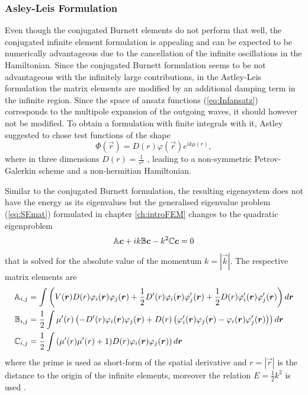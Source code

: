 \subsubsection{Asley-Leis Formulation}
Even though the conjugated Burnett elements do not perform that well, the conjugated infinite element formulation is appealing and can be expected to be numerically advantageous due to the cancellation of the infinite oscillations in the Hamiltonian.
Since the conjugated Burnett formulation seems to be not advantageous with the infinitely large contributions, in the Astley-Leis formulation the matrix elements are modified by an additional damping term in the infinite region.
Since the space of ansatz functions (\ref{eq:Infansatz}) corresponds to the multipole expansion of the outgoing waves, it should however not be modified.
To obtain a formulation with finite integrals with it, Astley suggested to chose test functions of the shape
\begin{equation} \label{eq:ALelem}
 \Phi(\vec{r}) = D(r)\varphi(\vec{r}) e^{ik\mu(r)},
\end{equation}
where in three dimensions $D(r)=\frac{1}{r^2}$ \cite{astley2}, leading to a non-symmetric Petrov-Galerkin scheme and a non-hermitian Hamiltonian.

Similar to the conjugated Burnett formulation, the resulting eigensystem does not have the energy as its eigenvalues but the generalised eigenvalue problem (\ref{eq:SEmat}) formulated in chapter \ref{ch:introFEM} changes to the quadratic eigenproblem
\begin{equation} \label{eq:SEinf}
\mathbb{A}\bm{c} +ik \mathbb{B}\bm{c}- k^2 \mathbb{C}\bm{c} =0 
\end{equation}
that is solved for the absolute value of the momentum $k=|\vec{k}|$.
The respective matrix elements are
\begin{align} \label{eq:InFEMmatrix}
\mathbb{A}_{i,j}& =\int \left(V(\bm{r}) D(r) \varphi_i(\bm{r}) \varphi_j(\bm{r}) 
                 +\frac 12 D'(r) \varphi_i(\bm{r})\varphi'_j(\bm{r})
                 +\frac 12 D(r) \varphi'_i(\bm{r})\varphi'_j(\bm{r}) \right) d\bm{r}\\
\mathbb{B}_{i,j}&=\frac 12 \int \mu'(r)\left(-D'(r) \varphi_i(\bm{r})\varphi_j(\bm{r})
                + D(r) \left(\varphi'_i(\bm{r})\varphi_j(\bm{r}) -\varphi_i(\bm{r})\varphi'_j(\bm{r})\right) \right) d\bm{r} \\
\mathbb{C}_{i,j}&= \frac 12 \int \left( \mu'(r) \mu'(r) + 1) D(r) \varphi_i(\bm{r}) \varphi_j(\bm{r})\right) d\bm{r}
\end{align}
where the prime is used as short-form of the spatial derivative and $r=|\vec{r}|$ is the distance to the origin of the infinite elements, moreover the relation $E=\frac 12 k^2$ is used \cite{dreyer}.

